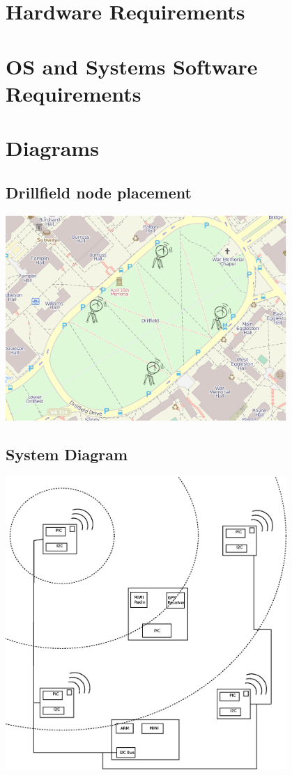 \documentclass{article}
\begin{document}
\section*{Hardware Requirements}

\section*{OS and Systems Software Requirements}

\section*{Diagrams}
\subsection*{Drillfield node placement}
\includegraphics[width=0.8\textwidth]{node_placement}
\subsection*{System Diagram}
\includegraphics[width=0.8\textwidth]{system}
\end{document}
